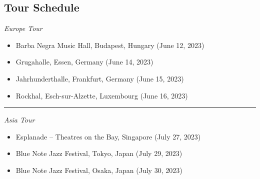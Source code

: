 \documentclass[12pt]{../templates/classes/res}
\begin{document}
\begin{resume}
\begin{minipage}[t]{0.35\linewidth}
  \section{Tour Schedule}
  \vspace{10pt}
  \footnotesize{
\begin{minipage}[t]{1.0\linewidth}
  \vspace{1pt}
  \raggedright{\emph{Europe Tour}}
\end{minipage}
\begin{minipage}[t]{1.0\linewidth}
  \begin{flushleft}
  \vspace{2pt}
    \begin{itemize}
      \item Barba Negra Music Hall, Budapest, Hungary (June 12, 2023)
\item Grugahalle, Essen, Germany (June 14, 2023)
\item Jahrhunderthalle, Frankfurt, Germany (June 15, 2023)
\item Rockhal, Esch-sur-Alzette, Luxembourg (June 16, 2023)

    \end{itemize}
  \end{flushleft}
  \vspace{-8pt}
\end{minipage}
\rule{1.0\textwidth}{0.1pt}
\begin{minipage}[t]{1.0\linewidth}
  \vspace{1pt}
  \raggedright{\emph{Asia Tour}}
\end{minipage}
\begin{minipage}[t]{1.0\linewidth}
  \begin{flushleft}
  \vspace{2pt}
    \begin{itemize}
      \item Esplanade – Theatres on the Bay, Singapore (July 27, 2023)
\item Blue Note Jazz Festival, Tokyo, Japan (July 29, 2023)
\item Blue Note Jazz Festival, Osaka, Japan (July 30, 2023)

    \end{itemize}
  \end{flushleft}
  \vspace{-8pt}
\end{minipage}
}
\end{minipage}
\hfill
\end{resume} 
\end{document}
